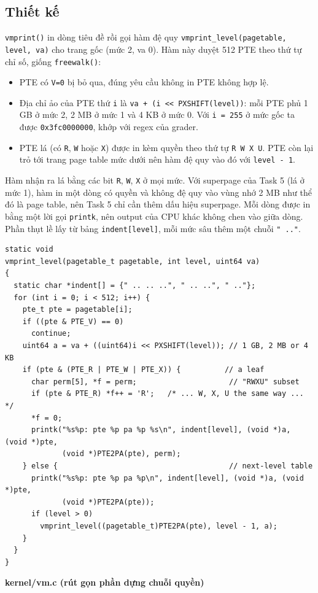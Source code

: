 \documentclass[10pt,a4paper]{article}
\newcommand{\srcname}[1]{{\small\bfseries\color{hcmus}#1}\par\vspace{-2pt}}
\newcommand{\cc}[1]{\texttt{#1}}
\begin{document}
\subsection{Thiết kế}
\cc{vmprint()} in dòng tiêu đề rồi gọi hàm đệ quy \cc{vmprint\_level(pagetable, level, va)} cho trang gốc (mức 2, va 0). Hàm này duyệt 512 PTE theo thứ tự chỉ số, giống \cc{freewalk()}:
\begin{itemize}
  \item PTE có \cc{V=0} bị bỏ qua, đúng yêu cầu không in PTE không hợp lệ.
  \item Địa chỉ ảo của PTE thứ \cc{i} là \cc{va + (i << PXSHIFT(level))}: mỗi PTE phủ 1 GB ở mức 2, 2 MB ở mức 1 và 4 KB ở mức 0. Với \cc{i = 255} ở mức gốc ta được \cc{0x3fc0000000}, khớp với regex của grader.
  \item PTE lá (có \cc{R}, \cc{W} hoặc \cc{X}) được in kèm quyền theo thứ tự \cc{R W X U}. PTE còn lại trỏ tới trang page table mức dưới nên hàm đệ quy vào đó với \cc{level - 1}.
\end{itemize}
Hàm nhận ra lá bằng các bit \cc{R}, \cc{W}, \cc{X} ở mọi mức. Với superpage của Task 5 (lá ở mức 1), hàm in một dòng có quyền và không đệ quy vào vùng nhớ 2 MB như thể đó là page table, nên Task 5 chỉ cần thêm dấu hiệu superpage. Mỗi dòng được in bằng một lời gọi \cc{printk}, nên output của CPU khác không chen vào giữa dòng. Phần thụt lề lấy từ bảng \cc{indent[level]}, mỗi mức sâu thêm một chuỗi \cc{" .."}.

\begin{lstlisting}
static void
vmprint_level(pagetable_t pagetable, int level, uint64 va)
{
  static char *indent[] = {" .. .. ..", " .. ..", " .."};
  for (int i = 0; i < 512; i++) {
    pte_t pte = pagetable[i];
    if ((pte & PTE_V) == 0)
      continue;
    uint64 a = va + ((uint64)i << PXSHIFT(level)); // 1 GB, 2 MB or 4 KB
    if (pte & (PTE_R | PTE_W | PTE_X)) {          // a leaf
      char perm[5], *f = perm;                     // "RWXU" subset
      if (pte & PTE_R) *f++ = 'R';   /* ... W, X, U the same way ... */
      *f = 0;
      printk("%s%p: pte %p pa %p %s\n", indent[level], (void *)a, (void *)pte,
             (void *)PTE2PA(pte), perm);
    } else {                                       // next-level table
      printk("%s%p: pte %p pa %p\n", indent[level], (void *)a, (void *)pte,
             (void *)PTE2PA(pte));
      if (level > 0)
        vmprint_level((pagetable_t)PTE2PA(pte), level - 1, a);
    }
  }
}
\end{lstlisting}
\vspace{-2pt}
\srcname{kernel/vm.c (rút gọn phần dựng chuỗi quyền)}
\end{document}
